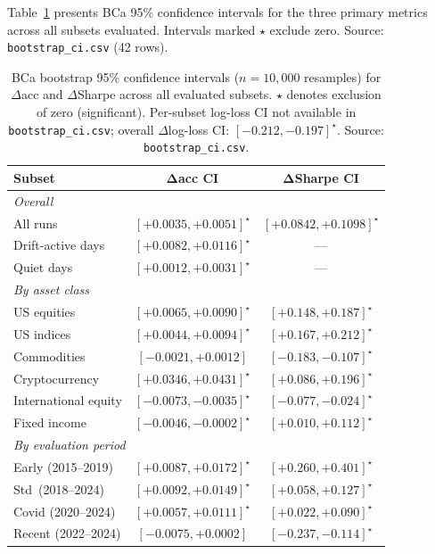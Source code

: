 \begin{appendices}
Table~\ref{tab:bca_full} presents BCa 95\% confidence intervals for the three primary
metrics across all subsets evaluated.  Intervals marked $\star$ exclude zero.
Source: \texttt{bootstrap\_ci.csv} (42 rows).

\begin{table}[htbp]
  \centering
  \caption{BCa bootstrap 95\% confidence intervals ($n{=}10{,}000$ resamples) for
    $\Delta$acc and $\Delta$Sharpe across all evaluated subsets.  $\star$ denotes
    exclusion of zero (significant).  Per-subset log-loss CI not available in
    \texttt{bootstrap\_ci.csv}; overall $\Delta$log-loss CI: $[-0.212,-0.197]^\star$.
    Source: \texttt{bootstrap\_ci.csv}.}
  \label{tab:bca_full}
  \small
  \begin{tabular}{lcc}
    \hline
    \textbf{Subset} & $\bm{\Delta}$\textbf{acc CI}
      & $\bm{\Delta}$\textbf{Sharpe CI} \\
    \hline
    \multicolumn{3}{l}{\textit{Overall}} \\
    All runs             & $[{+}0.0035,{+}0.0051]^\star$ & $[{+}0.0842,{+}0.1098]^\star$ \\
    Drift-active days    & $[{+}0.0082,{+}0.0116]^\star$ & --- \\
    Quiet days           & $[{+}0.0012,{+}0.0031]^\star$ & --- \\
    \hline
    \multicolumn{3}{l}{\textit{By asset class}} \\
    US equities          & $[{+}0.0065,{+}0.0090]^\star$ & $[{+}0.148,{+}0.187]^\star$ \\
    US indices           & $[{+}0.0044,{+}0.0094]^\star$ & $[{+}0.167,{+}0.212]^\star$ \\
    Commodities          & $[-0.0021,{+}0.0012]$          & $[-0.183,-0.107]^\star$      \\
    Cryptocurrency       & $[{+}0.0346,{+}0.0431]^\star$ & $[{+}0.086,{+}0.196]^\star$ \\
    International equity & $[-0.0073,-0.0035]^\star$      & $[-0.077,-0.024]^\star$      \\
    Fixed income         & $[-0.0046,-0.0002]^\star$      & $[{+}0.010,{+}0.112]^\star$ \\
    \hline
    \multicolumn{3}{l}{\textit{By evaluation period}} \\
    Early (2015--2019)   & $[{+}0.0087,{+}0.0172]^\star$ & $[{+}0.260,{+}0.401]^\star$ \\
    Std\ (2018--2024)    & $[{+}0.0092,{+}0.0149]^\star$ & $[{+}0.058,{+}0.127]^\star$ \\
    Covid (2020--2024)   & $[{+}0.0057,{+}0.0111]^\star$ & $[{+}0.022,{+}0.090]^\star$ \\
    Recent (2022--2024)  & $[-0.0075,{+}0.0002]$         & $[-0.237,-0.114]^\star$      \\
    \hline
  \end{tabular}
\end{table}


\end{appendices}
